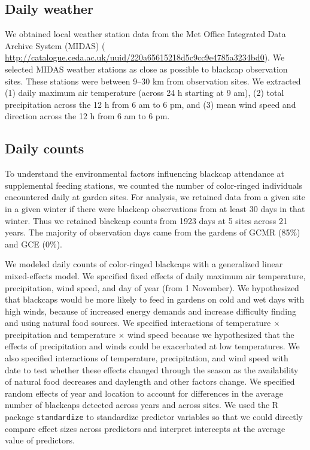 \documentclass[a4paper, twoside]{templates/ociamthesis}
\begin{document}
\hypertarget{daily-weather}{%
\subsection{Daily weather}\label{daily-weather}}

We obtained local weather station data from the Met Office Integrated Data Archive System (MIDAS) \autocite{metofficeMetOfficeIntegrated2012} ( \url{http://catalogue.ceda.ac.uk/uuid/220a65615218d5c9cc9e4785a3234bd0}). We selected MIDAS weather stations as close as possible to blackcap observation sites. These stations were between 9--30 km from observation sites. We extracted (1) daily maximum air temperature (across 24 h starting at 9 am), (2) total precipitation across the 12 h from 6 am to 6 pm, and (3) mean wind speed and direction across the 12 h from 6 am to 6 pm.

\hypertarget{daily-counts}{%
\subsection{Daily counts}\label{daily-counts}}

To understand the environmental factors influencing blackcap attendance at supplemental feeding stations, we counted the number of color-ringed individuals encountered daily at garden sites. For analysis, we retained data from a given site in a given winter if there were blackcap observations from at least 30 days in that winter. Thus we retained blackcap counts from 1923 days at 5 sites across 21 years. The majority of observation days came from the gardens of GCMR (85\%) and GCE (0\%).

We modeled daily counts of color-ringed blackcaps with a generalized linear mixed-effects model. We specified fixed effects of daily maximum air temperature, precipitation, wind speed, and day of year (from 1 November). We hypothesized that blackcaps would be more likely to feed in gardens on cold and wet days with high winds, because of increased energy demands and increase difficulty finding and using natural food sources. We specified interactions of temperature \(\times\) precipitation and temperature \(\times\) wind speed because we hypothesized that the effects of precipitation and winds could be exacerbated at low temperatures. We also specified interactions of temperature, precipitation, and wind speed with date to test whether these effects changed through the season as the availability of natural food decreases and daylength and other factors change. We specified random effects of year and location to account for differences in the average number of blackcaps detected across years and across sites. We used the R package \texttt{standardize} to standardize predictor variables so that we could directly compare effect sizes across predictors and interpret intercepts at the average value of predictors.
\end{document}

